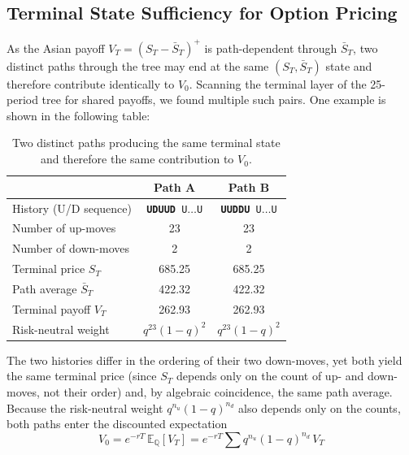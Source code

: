 \documentclass[hidelinks, 12pt, a4paper]{article}
\theoremstyle{definition}
\begin{document}
\subsection{Terminal State Sufficiency for Option Pricing}

As the Asian payoff $V_T = (S_T - \bar{S}_T)^+$ is path-dependent
through $\bar{S}_T$, two distinct paths through the tree may end at the
same $(S_T, \bar{S}_T)$ state and therefore contribute identically to
$V_0$. Scanning the terminal layer of the 25-period tree for shared
payoffs, we found multiple such pairs. One example is shown in the following table:

\begin{table}[H]
  \centering
  \caption{Two distinct paths producing the same terminal state and therefore
  the same contribution to $V_0$.}
  \label{tab:same-payoff}

  \begin{tabular}{lcc}
    \toprule
    & \textbf{Path A} & \textbf{Path B} \\
    \midrule
    History (U/D sequence)         & \texttt{\textbf{UDUUD} U$\ldots$U} & \texttt{\textbf{UUDDU} U$\ldots$U} \\
    Number of up-moves             & 23                        & 23 \\
    Number of down-moves           & 2                         & 2 \\
    Terminal price $S_T$           & 685.25                    & 685.25 \\
    Path average $\bar{S}_T$       & 422.32                    & 422.32 \\
    Terminal payoff $V_T$          & 262.93                    & 262.93 \\
    Risk-neutral weight            & $q^{23}(1-q)^2$           & $q^{23}(1-q)^2$ \\
    \bottomrule
  \end{tabular}
\end{table}

The two histories differ in the ordering of their two down-moves, yet
both yield the same terminal price (since $S_T$ depends only on the
count of up- and down-moves, not their order) and, by algebraic
coincidence, the same path average. Because the risk-neutral weight
$q^{n_u}(1-q)^{n_d}$ also depends only on the counts, both paths enter
the discounted expectation
\begin{equation}
V_0 = e^{-rT} \, \mathbb{E}_{\mathbb{Q}}[V_T]
    = e^{-rT} \sum q^{n_u}(1-q)^{n_d}\, V_T
\end{equation}
\end{document}
